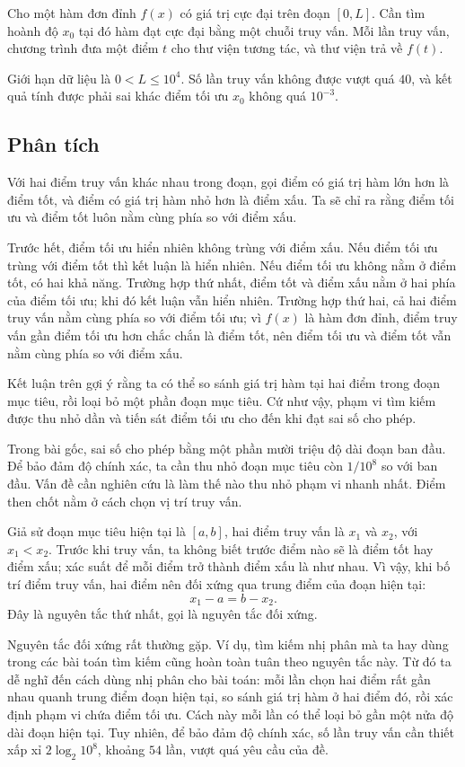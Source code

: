 \documentclass[11pt]{article}
\begin{document}
Cho một hàm đơn đỉnh \(f(x)\) có giá trị cực đại trên đoạn \([0,L]\). Cần tìm
hoành độ \(x_0\) tại đó hàm đạt cực đại bằng một chuỗi truy vấn. Mỗi lần
truy vấn, chương trình đưa một điểm \(t\) cho thư viện tương tác, và thư viện
trả về \(f(t)\).

Giới hạn dữ liệu là \(0<L\le 10^4\). Số lần truy vấn không được vượt quá
\(40\), và kết quả tính được phải sai khác điểm tối ưu \(x_0\) không quá
\(10^{-3}\).

\subsection{Phân tích}

Với hai điểm truy vấn khác nhau trong đoạn, gọi điểm có giá trị hàm lớn hơn
là điểm tốt, và điểm có giá trị hàm nhỏ hơn là điểm xấu. Ta sẽ chỉ ra rằng
điểm tối ưu và điểm tốt luôn nằm cùng phía so với điểm xấu.

Trước hết, điểm tối ưu hiển nhiên không trùng với điểm xấu. Nếu điểm tối ưu
trùng với điểm tốt thì kết luận là hiển nhiên. Nếu điểm tối ưu không nằm ở
điểm tốt, có hai khả năng. Trường hợp thứ nhất, điểm tốt và điểm xấu nằm ở
hai phía của điểm tối ưu; khi đó kết luận vẫn hiển nhiên. Trường hợp thứ hai,
cả hai điểm truy vấn nằm cùng phía so với điểm tối ưu; vì \(f(x)\) là hàm đơn
đỉnh, điểm truy vấn gần điểm tối ưu hơn chắc chắn là điểm tốt, nên điểm tối
ưu và điểm tốt vẫn nằm cùng phía so với điểm xấu.

Kết luận trên gợi ý rằng ta có thể so sánh giá trị hàm tại hai điểm trong
đoạn mục tiêu, rồi loại bỏ một phần đoạn mục tiêu. Cứ như vậy, phạm vi tìm
kiếm được thu nhỏ dần và tiến sát điểm tối ưu cho đến khi đạt sai số cho
phép.

Trong bài gốc, sai số cho phép bằng một phần mười triệu độ dài đoạn ban đầu.
Để bảo đảm độ chính xác, ta cần thu nhỏ đoạn mục tiêu còn \(1/10^8\) so với
ban đầu. Vấn đề cần nghiên cứu là làm thế nào thu nhỏ phạm vi nhanh nhất.
Điểm then chốt nằm ở cách chọn vị trí truy vấn.

Giả sử đoạn mục tiêu hiện tại là \([a,b]\), hai điểm truy vấn là \(x_1\) và
\(x_2\), với \(x_1<x_2\). Trước khi truy vấn, ta không biết trước điểm nào sẽ
là điểm tốt hay điểm xấu; xác suất để mỗi điểm trở thành điểm xấu là như
nhau. Vì vậy, khi bố trí điểm truy vấn, hai điểm nên đối xứng qua trung điểm
của đoạn hiện tại:
\[
  x_1-a=b-x_2.
\]
Đây là nguyên tắc thứ nhất, gọi là nguyên tắc đối xứng.

Nguyên tắc đối xứng rất thường gặp. Ví dụ, tìm kiếm nhị phân mà ta hay dùng
trong các bài toán tìm kiếm cũng hoàn toàn tuân theo nguyên tắc này. Từ đó ta
dễ nghĩ đến cách dùng nhị phân cho bài toán: mỗi lần chọn hai điểm rất gần
nhau quanh trung điểm đoạn hiện tại, so sánh giá trị hàm ở hai điểm đó, rồi
xác định phạm vi chứa điểm tối ưu. Cách này mỗi lần có thể loại bỏ gần một
nửa độ dài đoạn hiện tại. Tuy nhiên, để bảo đảm độ chính xác, số lần truy vấn
cần thiết xấp xỉ \(2\log_2 10^8\), khoảng \(54\) lần, vượt quá yêu cầu của
đề.
\end{document}
